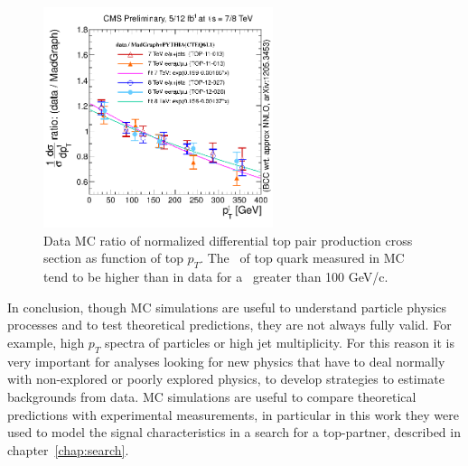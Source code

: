 \begin{figure}[!Hhtbp]
  \begin{center}
    \includegraphics[width=0.6\textwidth]{figs/topPtDataOverMadgraphPythia.png}
    \caption{Data MC ratio of normalized differential top pair production cross section as function of top $p_{T}$. The \pt~of top quark measured in MC tend to be higher than in data for a \pt~greater than 100 GeV/c.}
    \label{fig:TopPTReweighting}
  \end{center}
\end{figure}

In conclusion, though MC simulations are useful to understand particle physics processes and to test theoretical predictions, they are not always fully valid. For example, high $p_{T}$ spectra of particles or high jet multiplicity. For this reason it is very important for analyses looking for new physics that have to deal normally with non-explored or poorly explored physics, to develop strategies to estimate backgrounds from data. MC simulations are useful to compare theoretical predictions with experimental measurements, in particular in this work they were used to model the signal characteristics in a search for a top-partner, described in chapter~\ref{chap:search}. 